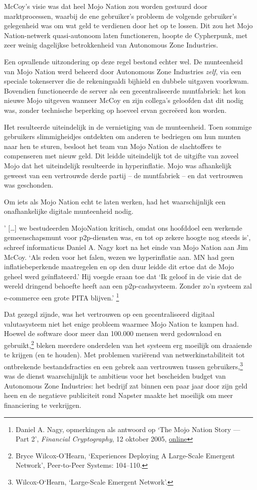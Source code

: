 \documentclass[
  a5paper,
  smalldemyvopaper,11pt,twoside,onecolumn,openright,extrafontsizes]{memoir}
\begin{document}
McCoy's visie was dat heel Mojo Nation zou worden gestuurd door
marktprocessen, waarbij de ene gebruiker's probleem de volgende
gebruiker's gelegenheid was om wat geld te verdienen door het op te
lossen. Dit zou het Mojo Nation-netwerk quasi-autonoom laten
functioneren, hoopte de Cypherpunk, met zeer weinig dagelijkse
betrokkenheid van Autonomous Zone Industries.

Een opvallende uitzondering op deze regel bestond echter wel. De
munteenheid van Mojo Nation werd beheerd door Autonomous Zone Industries
\emph{zelf}, via een speciale tokenserver die de rekeningsaldi bijhield
en dubbele uitgaven voorkwam. Bovendien functioneerde de server als een
gecentraliseerde muntfabriek: het kon nieuwe Mojo uitgeven wanneer McCoy
en zijn collega's geloofden dat dit nodig was, zonder technische
beperking op hoeveel ervan gecreëerd kon worden.

Het resulteerde uiteindelijk in de vernietiging van de munteenheid. Toen
sommige gebruikers slimmigheidjes ontdekten om anderen te bedriegen om
hun munten naar hen te sturen, besloot het team van Mojo Nation de
slachtoffers te compenseren met nieuw geld. Dit leidde uiteindelijk tot
de uitgifte van zoveel Mojo dat het uiteindelijk resulteerde in
hyperinflatie. Mojo was afhankelijk geweest van een vertrouwde derde
partij -- de muntfabriek -- en dat vertrouwen was geschonden.

Om iets als Mojo Nation echt te laten werken, had het waarschijnlijk een
onafhankelijke digitale munteenheid nodig.

' {[}\ldots{]} we bestudeerden MojoNation kritisch, omdat ons hoofddoel
een werkende gemeenschapsmunt voor p2p-diensten was, en tot op zekere
hoogte nog steeds is', schreef informaticus Daniel A. Nagy kort na het
einde van Mojo Nation aan Jim McCoy. `Als reden voor het falen, wezen we
hyperinflatie aan. MN had geen inflatiebeperkende maatregelen en op den
duur leidde dit ertoe dat de Mojo geheel werd geïnflateerd.' Hij voegde
eraan toe dat `Ik geloof in de visie dat de wereld dringend behoefte
heeft aan een p2p-cashsysteem. Zonder zo'n systeem zal e-commerce een
grote PITA blijven.' \footnote{Daniel A. Nagy, opmerkingen als antwoord
  op `The Mojo Nation Story --- Part 2', \emph{Financial Cryptography},
  12 oktober 2005,
  \href{https://www.financialcryptography.com/mt/archives/000572.html}{online}}

Dat gezegd zijnde, was het vertrouwen op een gecentraliseerd digitaal
valutasysteem niet het enige probleem waarmee Mojo Nation te kampen had.
Hoewel de software door meer dan 100.000 mensen werd gedownload en
gebruikt,\footnote{Bryce Wilcox-O'Hearn, `Experiences Deploying A
  Large-Scale Emergent Network', Peer-to-Peer Systems: 104--110.} bleken
meerdere onderdelen van het systeem erg moeilijk om draaiende te krijgen
(en te houden). Met problemen variërend van netwerkinstabiliteit tot
ontbrekende bestandsfracties en een gebrek aan vertrouwen tussen
gebruikers,\footnote{Wilcox-O`Hearn, `Large-Scale Emergent Network'.}
was de dienst waarschijnlijk te ambitieus voor het bescheiden budget van
Autonomous Zone Industries: het bedrijf zat binnen een paar jaar door
zijn geld heen en de negatieve publiciteit rond Napster maakte het
moeilijk om meer financiering te verkrijgen.
\end{document}
